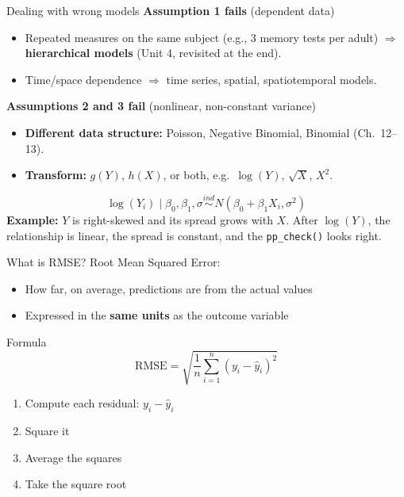 \documentclass[aspectratio=43,11pt]{beamer}
\begin{document}
{\begin{frame}{Dealing with wrong models}
  \textbf{Assumption 1 fails} (dependent data)
  \begin{itemize}
    \item Repeated measures on the same subject (e.g., 3 memory tests per adult) $\Rightarrow$ \textbf{hierarchical models} (Unit 4, revisited at the end).
    \item Time/space dependence $\Rightarrow$ time series, spatial, spatiotemporal models.
  \end{itemize}
  \textbf{Assumptions 2 and 3 fail} (nonlinear, non-constant variance)
  \begin{itemize}
    \item \textbf{Different data structure:} Poisson, Negative Binomial, Binomial (Ch.\ 12--13).
    \item \textbf{Transform:} $g(Y)$, $h(X)$, or both, e.g.\ $\log(Y)$, $\sqrt X$, $X^2$.
  \end{itemize}
  \[
    \log(Y_i)\mid\beta_0,\beta_1,\sigma\overset{ind}{\sim}N(\beta_0+\beta_1X_i,\sigma^2)
  \]
  \textbf{Example:} $Y$ is right-skewed and its spread grows with $X$. After $\log(Y)$, the relationship is linear, the spread is constant, and the \texttt{pp\_check()} looks right.
\end{frame}
}

\begin{frame}{What is RMSE?}
  Root Mean Squared Error:
  \begin{itemize}
    \item How far, on average, predictions are from the actual values
    \item Expressed in the \textbf{same units} as the outcome variable
  \end{itemize}
\end{frame}

\begin{frame}{Formula}
  \[
    \text{RMSE} = \sqrt{\frac{1}{n}\sum_{i=1}^{n}\left(y_i - \hat{y}_i\right)^2}
  \]
  \vspace{1em}
  \begin{enumerate}
    \item Compute each residual: $y_i - \hat{y}_i$
    \item Square it
    \item Average the squares
    \item Take the square root
  \end{enumerate}
\end{frame}
\end{document}
